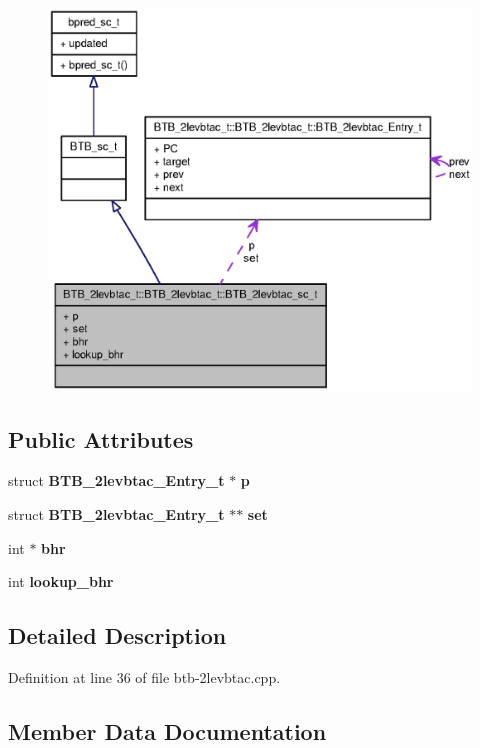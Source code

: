\begin{figure}[H]
\begin{center}
\leavevmode
\includegraphics[width=400pt]{classBTB__2levbtac__t_1_1BTB__2levbtac__sc__t__coll__graph}
\end{center}
\end{figure}
\subsection*{Public Attributes}
\begin{CompactItemize}
\item 
struct {\bf BTB\_\-2levbtac\_\-Entry\_\-t} $\ast$ {\bf p}
\item 
struct {\bf BTB\_\-2levbtac\_\-Entry\_\-t} $\ast$$\ast$ {\bf set}
\item 
int $\ast$ {\bf bhr}
\item 
int {\bf lookup\_\-bhr}
\end{CompactItemize}


\subsection{Detailed Description}


Definition at line 36 of file btb-2levbtac.cpp.

\subsection{Member Data Documentation}
